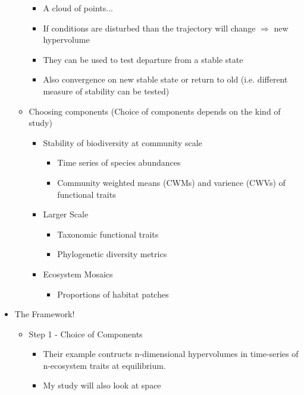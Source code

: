 \documentclass[11pt]{article}
\begin{document}
\begin{itemize}
\begin{itemize}
\begin{itemize}
			\item A cloud of points...
			\item If conditions are disturbed than the trajectory will change $\Rightarrow$ new hypervolume
			\item They can be used to test departure from a stable state
			\item Also convergence on new stable state or return to old (i.e. different measure of stability can be tested)
			\end{itemize} 
			\item Choosing components (Choice of components depends on the kind of study)
			\begin{itemize}
				\item Stability of biodiversity at community scale
				\begin{itemize}
					\item Time series of species abundances
					\item Community weighted means (CWMs) and varience (CWVs) of functional traits
				\end{itemize}
				\item Larger Scale
				\begin{itemize}
					\item Taxonomic functional traits
					\item Phylogenetic diversity metrics
				\end{itemize}
				\item Ecosystem Mosaics
				\begin{itemize}
					\item Proportions of habitat patches
				\end{itemize}
			\end{itemize}
		\end{itemize}
		\item The Framework!
			\begin{itemize}
				\item Step 1 - Choice of Components
				\begin{itemize}
					\item Their example contructs n-dimensional hypervolumes in time-series of n-ecosystem traits at equilibrium.
					\item My study will also look at space
				\end{itemize}
				

\end{itemize}
\end{itemize}
\end{document}
